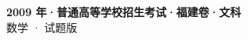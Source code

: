 \documentclass[zihao=-4, a4paper]{ctexart}
\begin{document}
\begin{center}
  {\Large\bfseries 2009 年·普通高等学校招生考试·福建卷·文科}\\[4pt]
  {\large 数学 · 试题版}
\end{center}
\medskip
{}

\end{document}
